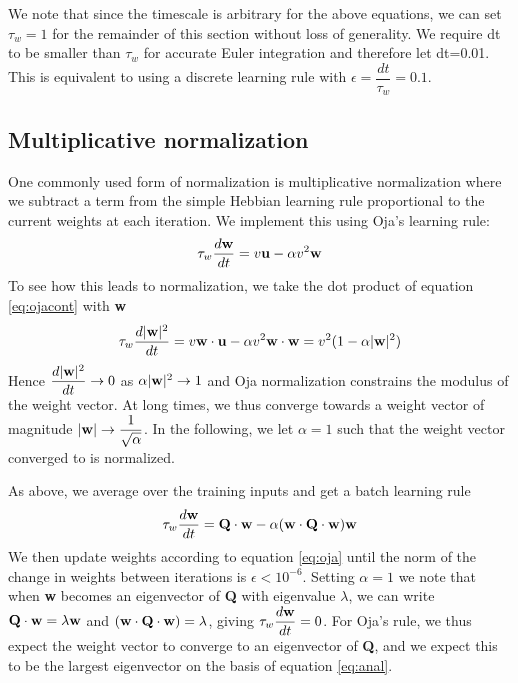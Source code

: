 \documentclass{article}
\begin{document}
We note that since the timescale is arbitrary for the above equations, we can set $\tau_w = 1$ for the remainder of this section without loss of generality. We require dt to be smaller than $\tau_w$ for accurate Euler integration and therefore let dt=0.01. This is equivalent to using a discrete learning rule with $\epsilon = \dfrac{dt}{\tau_w}=0.1$.

\subsection{Multiplicative normalization}

One commonly used form of normalization is multiplicative normalization where we subtract a term from the simple Hebbian learning rule proportional to the current weights at each iteration. We implement this using Oja's learning rule:
\begin{equation}\label{eq:ojacont}
\tau_w \dfrac{d\bf{w}}{dt} = v {\bf{u}} - \alpha v^2 {\bf{w}}
\end{equation}
To see how this leads to normalization, we take the dot product of equation \ref{eq:ojacont} with \textbf{w}
\begin{equation}
\tau_w \dfrac{d|{\bf{w}}|^2}{dt} = v {\bf{w} \cdot \bf{u}} - \alpha v^2 {\bf{w} \cdot \bf{w}} = v^2(1-\alpha |{\bf{w}}|^2)
\end{equation}
Hence $\dfrac{d|{\bf{w}}|^2}{dt} \rightarrow 0$ as $\alpha |{\bf{w}}|^2 \rightarrow 1$ and Oja normalization constrains the modulus of the weight vector. At long times, we thus converge towards a weight vector of magnitude $|{\bf{w}}| \rightarrow \dfrac{1}{\sqrt{\alpha}}$. In the following, we let $\alpha=1$ such that the weight vector converged to is normalized.

As above, we average over the training inputs and get a batch learning rule
\begin{equation}\label{eq:oja}
\tau_w \dfrac{d\bf{w}}{dt} = {\bf Q \cdot w} - \alpha ({\bf w \cdot Q \cdot w}) {\bf w}
\end{equation}
We then update weights according to equation \ref{eq:oja} until the norm of the change in weights between iterations is $\epsilon < 10^{-6}$. Setting $\alpha=1$ we note that when \textbf{w} becomes an eigenvector of \textbf{Q} with eigenvalue $\lambda$, we can write ${\bf Q \cdot w} = \lambda \bf w$ and $({\bf w \cdot Q \cdot w}) = \lambda$, giving  $\tau_w \dfrac{d\bf{w}}{dt} =0$. For Oja's rule, we thus expect the weight vector to converge to an eigenvector of \textbf{Q}, and we expect this to be the largest eigenvector on the basis of equation \ref{eq:anal}.
\end{document}
